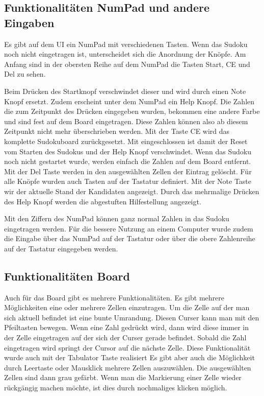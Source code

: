 \subsection{Funktionalitäten NumPad und andere Eingaben}
Es gibt auf dem \ac{UI} ein NumPad mit verschiedenen Tasten. Wenn das Sudoku noch nicht eingetragen ist, unterscheidet sich die Anordnung der Knöpfe. Am Anfang sind in der obersten Reihe auf dem NumPad die Tasten Start, \ac{CE} und Del zu sehen. 

Beim Drücken des Startknopf verschwindet dieser und wird durch einen Note Knopf ersetzt. Zudem erscheint unter dem NumPad ein Help Knopf. Die Zahlen die zum Zeitpunkt des Drücken eingegeben wurden, bekommen eine andere Farbe und sind fest auf dem Board eingetragen. Diese Zahlen können also ab diesem Zeitpunkt nicht mehr überschrieben werden. Mit der Taste \ac{CE} wird das komplette Sudokuboard zurückgesetzt. Mit eingeschlossen ist damit der Reset vom Starten des Sudokus und der Help Knopf verschwindet. Wenn das Sudoku noch nicht gestartet wurde, werden einfach die Zahlen auf dem Board entfernt. Mit der Del Taste werden in den ausgewählten Zellen der Eintrag gelöscht. Für alle Knöpfe wurden auch Tasten auf der Tastatur definiert.  Mit der Note Taste wir der aktuelle Stand der Kandidaten angezeigt. Durch das mehrmalige Drücken des Help Knopf werden die abgestuften Hilfestellung angezeigt.


Mit den Ziffern des NumPad können ganz normal Zahlen in das Sudoku eingetragen werden. Für die bessere Nutzung an einem Computer wurde zudem die Eingabe über das NumPad auf der Tastatur oder über die obere Zahlenreihe auf der Tastatur eingegeben werden.

\subsection{Funktionalitäten Board}
Auch für das Board gibt es mehrere Funktionalitäten. Es gibt mehrere Möglichkeiten eine oder mehrere Zellen einzutragen. Um die Zelle auf der man sich aktuell befindet ist eine bunte Umrandung. Diesen Curser kann man mit den Pfeiltasten bewegen. Wenn eine Zahl gedrückt wird, dann wird diese immer in der Zelle eingetragen auf der sich der Curser gerade befindet. Sobald die Zahl eingetragen wird springt der Cursor auf die nächste Zelle. Diese Funktionalität wurde auch mit der Tabulator Taste realisiert
Es gibt aber auch die Möglichkeit durch Leertaste oder Mausklick mehrere Zellen auszuwählen. Die ausgewählten Zellen sind dann grau gefärbt. Wenn man die Markierung einer Zelle wieder rückgängig machen möchte, ist dies durch nochmaliges klicken möglich. 

